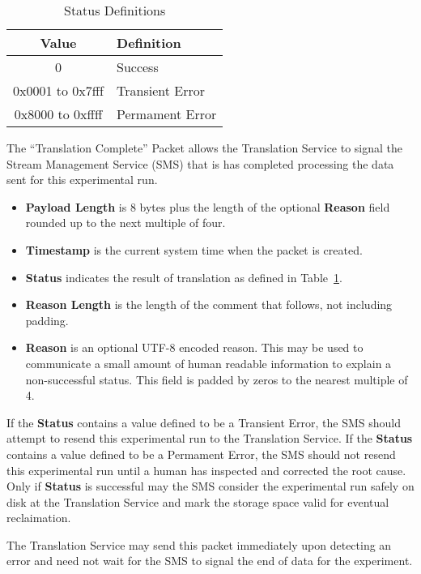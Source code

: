 \begin{table}[h]
  \begin{center}
    \begin{tabular}{c | l}
	Value & Definition \\
	\hline
	0 & Success \\
	0x0001 to 0x7fff & Transient Error \\
	0x8000 to 0xffff & Permament Error \\
    \end{tabular}
  \end{center}
  \caption {Status Definitions}
  \label{table:protocol_completion_status_values}
\end{table}

The ``Translation Complete'' Packet allows the Translation Service to signal
the Stream Management Service (SMS) that is has completed processing the data sent
for this experimental run.

\begin{itemize}
\item{\bf Payload Length} is 8 bytes plus the length of the optional
{\bf Reason} field rounded up to the next multiple of four.
\item{\bf Timestamp} is the current system time when the packet is created.
\item{\bf Status} indicates the result of translation as defined in
Table~\ref{table:protocol_completion_status_values}.
\item{\bf Reason Length} is the length of the comment that follows, not
including padding.
\item{\bf Reason} is an optional UTF-8 encoded reason. This may be used
to communicate a small amount of human readable information to explain
a non-successful status. This field is padded by zeros to the nearest
multiple of 4.
\end{itemize}

If the {\bf Status} contains a value defined to be a Transient Error, the SMS
should attempt to resend this experimental run to the Translation Service.  If
the {\bf Status} contains a value defined to be a Permament Error, the SMS
should not resend this experimental run until a human has inspected and
corrected the root cause. Only if {\bf Status} is successful may the SMS
consider the experimental run safely on disk at the Translation Service and
mark the storage space valid for eventual reclaimation.

The Translation Service may send this packet immediately upon detecting an
error and need not wait for the SMS to signal the end of data for the
experiment.


